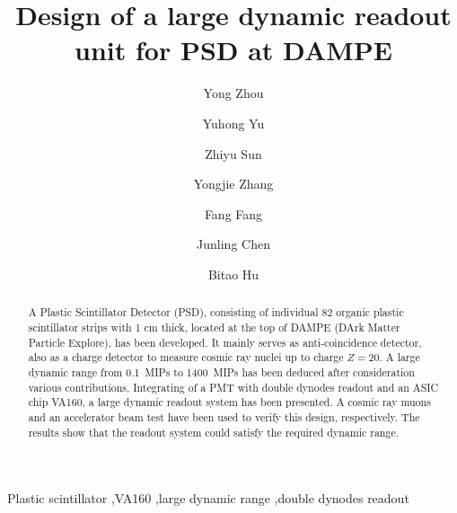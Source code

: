 \documentclass[5p, times]{elsarticle}
\begin{document}
\begin{frontmatter}

\title{Design of a large dynamic readout unit for PSD at DAMPE}

\author[imp,lzu,ucas]{Yong Zhou}

\author[imp]{Yuhong Yu}

\author[imp]{Zhiyu Sun}
\author[imp]{Yongjie Zhang}
\author[imp]{Fang Fang}
\author[imp]{Junling Chen}

\author[lzu]{Bitao Hu}

\address[imp]{Institute of Modern Physics, Chinese Academy of Sciences,  509 Nanchang Road,  Lanzhou,  730000,  P.R.China}
\address[lzu]{School of Nuclear Science and Technology,  Lanzhou University,  222 South Tianshui Road,  Lanzhou,  730000,  P.R.China}
\address[ucas]{Graduate University of the Chinese Academy of Sciences,  19A Yuquan Road,  Beijing,  100049,  P.R.China}

\begin{abstract}

A Plastic Scintillator Detector (PSD), consisting of individual 82 organic plastic scintillator strips with 1 cm thick,
located at the top of DAMPE (DArk Matter Particle Explore), has been developed. It mainly serves as anti-coincidence
detector, also as a charge detector to measure cosmic ray nuclei up to charge $Z=20$. A large dynamic range from \SI{0.1}{MIPs} to \SI{1400}{MIPs} has been deduced after consideration various contributions. Integrating of a PMT with double dynodes
readout and an ASIC chip VA160, a large dynamic readout system has been presented. A cosmic ray muons and an
accelerator beam test have been used to verify this design, respectively. The results show that the readout system
could satisfy the required dynamic range. 

\end{abstract}

\begin{keyword}
Plastic scintillator
\sep VA160
\sep large dynamic range
\sep double dynodes readout


\end{keyword}

\end{frontmatter}
\end{document}
